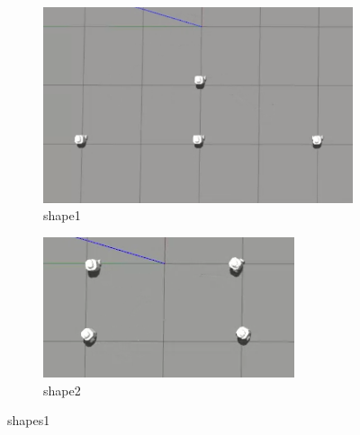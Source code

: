 \documentclass[12pt]{extarticle}
\begin{document}
\begin{figure}
\centering
\begin{subfigure}{.5\textwidth}
  \centering
  \includegraphics[width=.9\linewidth]{shape1}
  \caption{shape1}
  \label{fig:sub1}
\end{subfigure}%
\begin{subfigure}{.5\textwidth}
  \centering
  \includegraphics[width=.9\linewidth]{shape2}
  \caption{shape2}
  \label{fig:sub2}
\end{subfigure}
\caption{shapes1}
\label{fig:test}



\end{figure}
\end{document}
